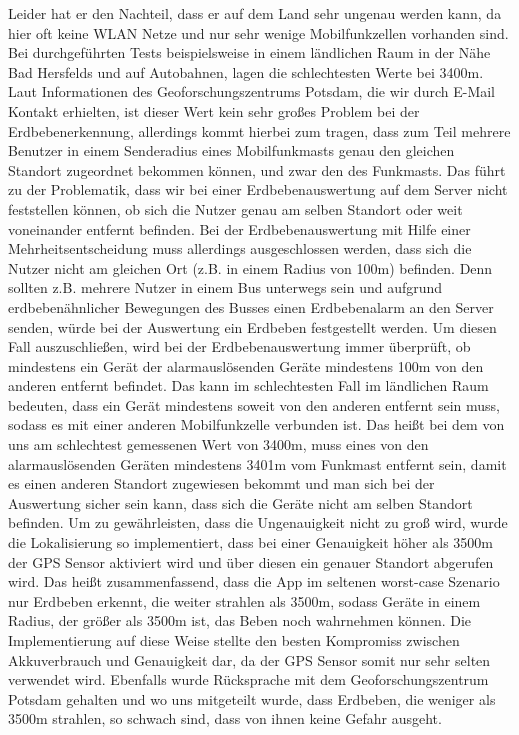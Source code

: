 Leider hat er den Nachteil, dass er auf dem Land sehr ungenau werden kann, da hier oft keine WLAN Netze und nur sehr wenige Mobilfunkzellen vorhanden sind. Bei durchgeführten Tests beispielsweise in einem ländlichen Raum in der Nähe Bad Hersfelds und auf Autobahnen, lagen die schlechtesten Werte bei 3400m. Laut Informationen des Geoforschungszentrums Potsdam, die wir durch E-Mail Kontakt erhielten, ist dieser Wert kein sehr großes Problem bei der Erdbebenerkennung, allerdings kommt hierbei zum tragen, dass zum Teil mehrere Benutzer in einem Senderadius eines Mobilfunkmasts genau den gleichen Standort zugeordnet bekommen können, und zwar den des Funkmasts. Das führt zu der Problematik, dass wir bei einer Erdbebenauswertung auf dem Server nicht feststellen können, ob sich die Nutzer genau am selben Standort oder weit voneinander entfernt befinden. Bei der Erdbebenauswertung mit Hilfe einer Mehrheitsentscheidung muss allerdings ausgeschlossen werden, dass sich die Nutzer nicht am gleichen Ort (z.B. in einem Radius von 100m) befinden. Denn sollten z.B. mehrere Nutzer in einem Bus unterwegs sein und aufgrund erdbebenähnlicher Bewegungen des Busses einen Erdbebenalarm an den Server senden, würde bei der Auswertung ein Erdbeben festgestellt werden. Um diesen Fall auszuschließen, wird bei der Erdbebenauswertung immer überprüft, ob mindestens ein Gerät der alarmauslösenden Geräte mindestens 100m von den anderen entfernt befindet. Das kann im schlechtesten Fall im ländlichen Raum bedeuten, dass ein Gerät mindestens soweit von den anderen entfernt sein muss, sodass es mit einer anderen Mobilfunkzelle verbunden ist. Das heißt bei dem von uns am schlechtest gemessenen Wert von 3400m, muss eines von den alarmauslösenden Geräten mindestens 3401m vom Funkmast entfernt sein, damit es einen anderen Standort zugewiesen bekommt und man sich bei der Auswertung sicher sein kann, dass sich die Geräte nicht am selben Standort befinden. Um zu gewährleisten, dass die Ungenauigkeit nicht zu groß wird, wurde die Lokalisierung so implementiert, dass bei einer Genauigkeit höher als 3500m der GPS Sensor aktiviert wird und über diesen ein genauer Standort abgerufen wird.
Das heißt zusammenfassend, dass die App im seltenen worst-case Szenario nur Erdbeben erkennt, die weiter strahlen als 3500m, sodass Geräte in einem Radius, der größer als 3500m ist, das Beben noch wahrnehmen können.
Die Implementierung auf diese Weise stellte den besten Kompromiss zwischen Akkuverbrauch und Genauigkeit dar, da der GPS Sensor somit nur sehr selten verwendet wird. Ebenfalls wurde Rücksprache mit dem Geoforschungszentrum Potsdam gehalten und wo uns mitgeteilt wurde, dass Erdbeben, die weniger als 3500m strahlen, so schwach sind, dass von ihnen keine Gefahr ausgeht. 
